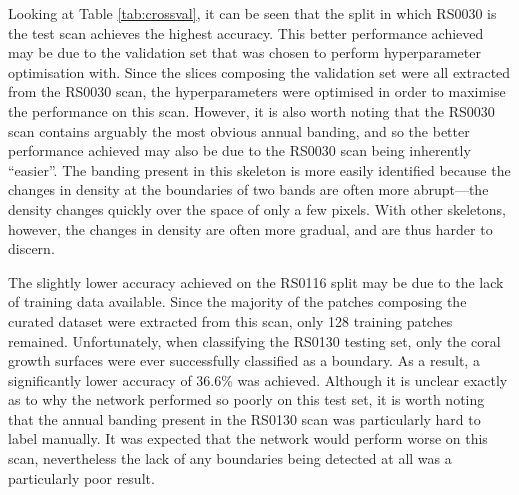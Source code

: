 Looking at Table \ref{tab:crossval}, it can be seen that the split in which RS0030 is the test scan achieves the highest accuracy. This better performance achieved may be due to the validation set that was chosen to perform hyperparameter optimisation with. Since the slices composing the validation set were all extracted from the RS0030 scan, the hyperparameters were optimised in order to maximise the performance on this scan. However, it is also worth noting that the RS0030 scan contains arguably the most obvious annual banding, and so the better performance achieved may also be due to the RS0030 scan being inherently ``easier''. The banding present in this skeleton is more easily identified because the changes in density at the boundaries of two bands are often more abrupt---the density changes quickly over the space of only a few pixels. With other skeletons, however, the changes in density are often more gradual, and are thus harder to discern.

The slightly lower accuracy achieved on the RS0116 split may be due to the lack of training data available. Since the majority of the patches composing the curated dataset were extracted from this scan, only 128 training patches remained. Unfortunately, when classifying the RS0130 testing set, only the coral growth surfaces were ever successfully classified as a boundary. As a result, a significantly lower accuracy of 36.6\% was achieved. Although it is unclear exactly as to why the network performed so poorly on this test set, it is worth noting that the annual banding present in the RS0130 scan was particularly hard to label manually. It was expected that the network would perform worse on this scan, nevertheless the lack of any boundaries being detected at all was a particularly poor result.

